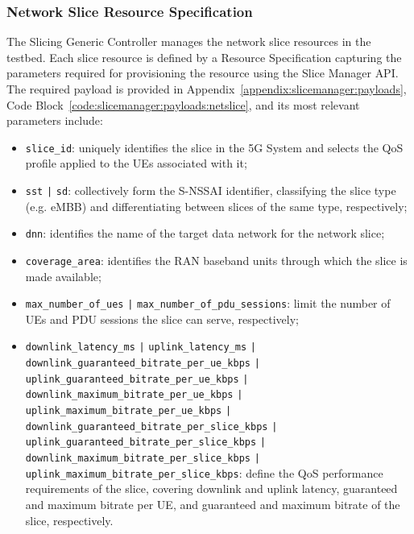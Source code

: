 \subsubsection{Network Slice Resource Specification}

The Slicing Generic Controller manages the network slice resources in the testbed. Each slice resource is defined by a Resource Specification capturing the parameters required for provisioning the resource using the Slice Manager \acs{API}. The required payload is provided in Appendix~\ref{appendix:slicemanager:payloads}, Code Block~\ref{code:slicemanager:payloads:netslice}, and its most relevant parameters include:

{\setlength{\emergencystretch}{3em}%
\begin{itemize}
    \item \texttt{slice\_id}: uniquely identifies the slice in the \acs{5G} System and selects the \acs{QoS} profile applied to the \acsp{UE} associated with it;
    \item \texttt{sst} \texttt{|} \texttt{sd}: collectively form the \acs{S-NSSAI} identifier, classifying the slice type (e.g. \acs{eMBB}) and differentiating between slices of the same type, respectively;
    \item \texttt{dnn}: identifies the name of the target data network for the network slice;
    \item \texttt{coverage\_area}: identifies the \acs{RAN} baseband units through which the slice is made available;
    \item \texttt{max\allowbreak\_number\allowbreak\_of\allowbreak\_ues} \texttt{|} \texttt{max\allowbreak\_number\allowbreak\_of\allowbreak\_pdu\allowbreak\_sessions}: limit the number of \acsp{UE} and \acs{PDU} sessions the slice can serve, respectively;
    \item \texttt{downlink\allowbreak\_latency\allowbreak\_ms} \texttt{|} \texttt{uplink\allowbreak\_latency\allowbreak\_ms} \texttt{|} \texttt{downlink\allowbreak\_guaranteed\allowbreak\_bitrate\allowbreak\_per\allowbreak\_ue\allowbreak\_kbps} \texttt{|} \texttt{uplink\allowbreak\_guaranteed\allowbreak\_bitrate\allowbreak\_per\allowbreak\_ue\allowbreak\_kbps} \texttt{|} \texttt{downlink\allowbreak\_maximum\allowbreak\_bitrate\allowbreak\_per\allowbreak\_ue\allowbreak\_kbps} \texttt{|} \texttt{uplink\allowbreak\_maximum\allowbreak\_bitrate\allowbreak\_per\allowbreak\_ue\allowbreak\_kbps} \texttt{|} \texttt{downlink\allowbreak\_guaranteed\allowbreak\_bitrate\allowbreak\_per\allowbreak\_slice\allowbreak\_kbps} \texttt{|} \texttt{uplink\allowbreak\_guaranteed\allowbreak\_bitrate\allowbreak\_per\allowbreak\_slice\allowbreak\_kbps} \texttt{|} \texttt{downlink\allowbreak\_maximum\allowbreak\_bitrate\allowbreak\_per\allowbreak\_slice\allowbreak\_kbps} \texttt{|} \texttt{uplink\allowbreak\_maximum\allowbreak\_bitrate\allowbreak\_per\allowbreak\_slice\allowbreak\_kbps}: define the \acs{QoS} performance requirements of the slice, covering downlink and uplink latency, guaranteed and maximum bitrate per \acs{UE}, and guaranteed and maximum bitrate of the slice, respectively.
\end{itemize}\par}

